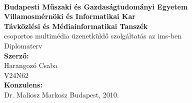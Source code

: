 
\begin{titlepage}
\begin{center}
 \\[20pt]
{\large \bf Budapesti Műszaki és Gazdaságtudományi Egyetem} \\
{\large \bf Villamosmérnöki és Informatikai Kar}\\
{\large \bf Távközlési és Médiainformatikai Tanszék}\\
\vfill {\Large \sc csoportos multimédia üzenetküldő szolgáltatás az ims-ben} \\[20pt]
{\large \sc Diplomaterv}\\
\vfill
{\bf Szerző:}\\
{\large Harangozó Csaba \\
{\sc V24N62} \\}
\vfill
{\bf Konzulens:}\\
Dr. Maliosz Markosz
\vfill {\Large Budapest, 2010.}
\end{center}
\end{titlepage}
